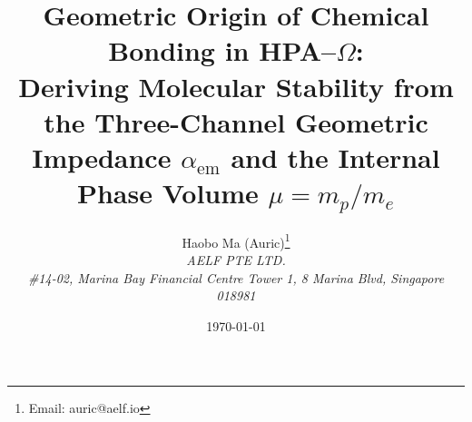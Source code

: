 \documentclass[11pt,a4paper]{article}
\title{Geometric Origin of Chemical Bonding in HPA--\texorpdfstring{$\Omega$}{Omega}:\\
Deriving Molecular Stability from the Three-Channel Geometric Impedance \texorpdfstring{$\alpha_{\mathrm{em}}$}{alpha\_em}
and the Internal Phase Volume \texorpdfstring{$\mu=m_p/m_e$}{mu}}
\author{Haobo Ma (Auric)\thanks{Email: auric@aelf.io} \\
\textit{AELF PTE LTD.} \\
\textit{\#14-02, Marina Bay Financial Centre Tower 1, 8 Marina Blvd, Singapore 018981}}
\date{\today}
\begin{document}
\maketitle













\FloatBarrier
\appendix



\FloatBarrier

\end{document}
